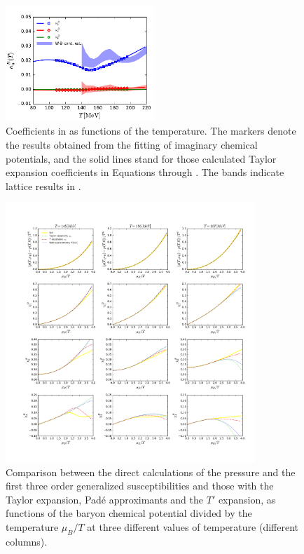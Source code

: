 \documentclass[%
reprint,
superscriptaddress,
preprintnumbers,
amsmath,amssymb,
aps,
prd,
]{revtex4-2}
\def\Eq#1{\Cref{#1}}
\begin{document}
%
\begin{figure}[t]
\includegraphics[width=0.5\textwidth]{kappa}
\caption{Coefficients in \Eq{eq:T_res} as functions of the temperature. The markers denote the results obtained from the fitting of imaginary chemical potentials, and the solid lines stand for those calculated Taylor expansion coefficients in Equations  through . The bands indicate lattice results in \cite{Borsanyi:2021sxv}.}\label{fig:kappa24}
\end{figure}
%

%
\begin{figure}[t]
\includegraphics[width=0.84\textwidth]{FixT}
\caption{Comparison between the direct calculations of the pressure and the first three order generalized susceptibilities and those with the Taylor expansion, Pad\'e approximants and the $T'$ expansion, as functions of the baryon chemical potential divided by the temperature $\mu_B/T$ at three different values of temperature (different columns).}\label{fig:pre_sus}
\end{figure}
%
\end{document}
